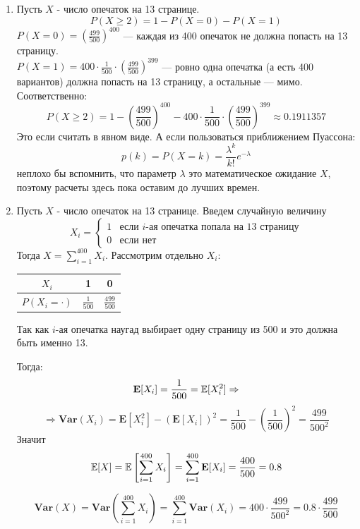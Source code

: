 \documentclass[12pt, a4paper]{article}\usepackage[]{graphicx}\usepackage[]{color}
\begin{document}
\begin{enumerate}
\begin{enumerate}
\item Пусть $X$ - число опечаток на 13 странице. $$P(X \geqslant 2) = 1 - P(X=0) - P(X=1) $$
$P(X=0) = \left( \frac{499}{500} \right)^{400}$ — каждая из 400 опечаток не должна попасть на 13 страницу.\\
$P(X=1) = 400\cdot\frac{1}{500}\cdot\left( \frac{499}{500} \right)^{399}$ — ровно одна опечатка (а есть 400 вариантов) должна попасть на 13 страницу, а остальные — мимо. Соответственно:
$$
P(X \geqslant 2) = 1 - \left( \frac{499}{500} \right)^{400} - 400\cdot\frac{1}{500}\cdot\left( \frac{499}{500} \right)^{399} \approx 0.1911357
$$
Это если считать в явном виде. А если пользоваться приближением Пуассона:
$$
p(k) = P(X = k) = \frac{\lambda^k}{k!}e^{-\lambda}
$$
неплохо бы вспомнить, что параметр $\lambda$ это математическое ожидание $X$, поэтому расчеты здесь пока оставим до лучших времен.

\item Пусть $X$ - число опечаток на 13 странице. Введем случайную величину
$$X_i =
\begin{cases}
1 & \text{если } i\text{-ая опечатка попала на 13 страницу}\\
0 & \text{если нет}
\end{cases}
$$
Тогда $X = \sum\limits_{i=1}^{400}X_i$. Рассмотрим отдельно $X_i$: \hspace{0.5cm}
\begin{minipage}{0.3\linewidth}

\begin{tabular}{c|c|c}
$X_i$ & 1 & 0 \\
\hline
$P(X_i = \cdot)$ & $\frac{1}{500} $ & $\frac{499}{500}$
\end{tabular}
\end{minipage}


Так как $i$-ая опечатка наугад выбирает одну страницу из 500 и это должна быть именно 13.

Тогда:
$$
\mathbf{E}[X_i] = \frac{1}{500} = \mathbb{E}[X^2_i] \Rightarrow
$$
$$
\Rightarrow \mathbf{Var}(X_i) = \mathbf{E}[X^2_i] - (\mathbf{E}[X_i])^2 = \frac{1}{500} - \left(\frac{1}{500}\right)^2 = \frac{499}{500^2}
$$
Значит
$$
\mathbb{E}[X] = \mathbb{E}\left[\sum\limits_{i=1}^{400}X_i\right] = \sum\limits_{i=1}^{400}\mathbf{E}[X_i]  = \frac{400}{500} = 0.8
$$

$$
\mathbf{Var}(X) = \mathbf{Var}\left(\sum\limits_{i=1}^{400}X_i\right) = \sum\limits_{i=1}^{400}\mathbf{Var}(X_i) = 400\cdot\frac{499}{500^2} = 0.8\cdot\frac{499}{500}
$$


\end{enumerate}
\end{enumerate}
\end{document}
